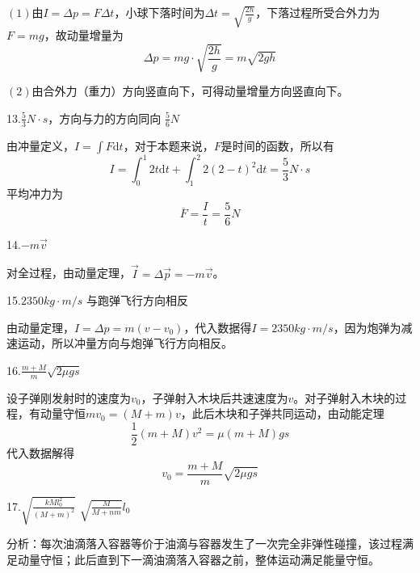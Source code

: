 \documentclass[blue, pad]{./templete/qyxfnote}
\newcommand{\di}[1]{\mathrm{d}#1}
\begin{document}
			$(1)$由$ I=\Delta p=F\Delta t $，小球下落时间为$\Delta t=\sqrt{\frac{2h}{g}}$，下落过程所受合外力为$F=mg$，故动量增量为
			\begin{equation*}
			\Delta p=mg\cdot\sqrt{\frac{2h}{g}}=m\sqrt{2gh}
			\end{equation*}
			
			$(2)$由合外力（重力）方向竖直向下，可得动量增量方向竖直向下。
			
			13.$\frac{5}{3}N\cdot s$，方向与力的方向同向 \hspace{2em} $\frac{5}{6}N$
			
			由冲量定义，$I = \int F \di t$，对于本题来说，$F$是时间的函数，所以有
			\begin{equation*}
			I = \int_0^1 2t \di t + \int_1^2 2(2-t)^2 \di t = \frac{5}{3}N \cdot s
			\end{equation*}
			平均冲力为
			\begin{equation*}
			\overline{F} = \frac{I}{t} = \frac{5}{6} N
			\end{equation*}
			
			14.$-m\vec{v}$
			
			对全过程，由动量定理，$\vec{I} = \Delta \vec{p} = -m\vec{v}$。
			
			15.$2350kg\cdot m/s$ \hspace{2em} 与跑弹飞行方向相反
			
			由动量定理，$I = \Delta p = m(v-v_0)$，代入数据得$I=2350kg\cdot m/s$，因为炮弹为减速运动，所以冲量方向与炮弹飞行方向相反。
			
			16.$\frac{m+M}{m}\sqrt{2 \mu gs}$
			
			设子弹刚发射时的速度为$v_0$，子弹射入木块后共速速度为$v$。对子弹射入木块的过程，有动量守恒$mv_0=(M+m)v$，此后木块和子弹共同运动，由动能定理
			\begin{equation*}
			\frac{1}{2}(m+M)v^2=\mu (m+M)gs
			\end{equation*}
			代入数据解得
			\begin{equation*}
			v_0=\frac{m+M}{m}\sqrt{2 \mu gs}
			\end{equation*}
			
			17.$\sqrt{\frac{kMl_0^2}{(M+m)^2}}$ \hspace{4em} $\sqrt{\frac{M}{M+nm}}l_0$
			
			分析：每次油滴落入容器等价于油滴与容器发生了一次完全非弹性碰撞，该过程满足动量守恒；此后直到下一滴油滴落入容器之前，整体运动满足能量守恒。
			
\end{document}
